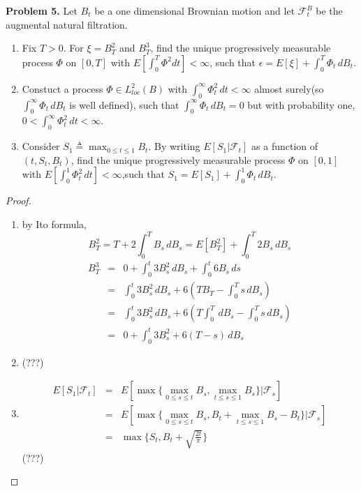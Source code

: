 \documentclass{article}     %
\begin{document}
\noindent 
\textbf{Problem 5.} Let $B_t$ be a one dimensional Brownian motion and let ${\mathcal{F}_t^B}$ be the augmental natural filtration.
\begin{enumerate}[(1)]
    \item Fix $T>0$. For $\xi = B_T^2$ and $B_T^3$, find the unique progressively measurable process $\Phi$ on $[0,T]$ with $E[\int_0^T\Phi^2 dt]<\infty$, such that $\epsilon = E[\xi]+\int_0^T\Phi_t\,d B_t$.
    \item Constuct a process $\Phi\in L^2_{loc}(B)$ with $\int_0^{\infty} \Phi_t^2\,dt <\infty$ almost surely(so $\int_0^{\infty}\Phi_t\,dB_t$ is well defined), such that $\int_0^{\infty} \Phi_t \,dB_t=0$ but with probability one, $0< \int_0^{\infty}\Phi_t^2\,dt<\infty$.
    \item Consider $S_1\triangleq \max_{0\leq t\leq 1}B_t$. By writing $E[S_1|\mathcal{F}_t]$ as a function of $(t,S_t,B_t)$, find the unique progressively measurable process $\Phi$ on $[0,1]$ with $E[\int_0^1 \Phi^2_t\,dt]<\infty$,such that $S_1 = E[S_1] + \int_0^1 \Phi_t\,d B_t$.  
\end{enumerate}

\begin{proof}
\begin{enumerate}[(1)]
    \item  by Ito formula, \[B_T^2 = T + 2 \int_0^T B_s\,d B_s = E[B_T^2] + \int_0^T 2B_s\, dB_s\]
     \begin{eqnarray*}
         B_T^3  & = &  0 + \int_0^t 3B_s^2\,dB_s+ \int_0^t 6B_s\,ds\\
          &=& \int_0^t 3B_s^2\,dB_s+ 6(TB_T-\int_0^T s \,dB_s)\\
          & = & \int_0^t 3B_s^2\,dB_s+ 6(T\int_0^T \,dB_s-\int_0^Ts\,dB_s)\\
          & = & 0 + \int_0^t 3B_s^2 + 6(T-s)\,dB_s
    \end{eqnarray*}
    \item (???)
    \item \begin{eqnarray*}
        E[S_1|\mathcal{F}_t] & =  & E[\max\{\max_{0\leq s\leq t}B_s, \max_{t\leq s\leq 1}B_s\}|\mathcal{F}_s]\\
                 & = & E[\max\{\max_{0\leq s\leq t}B_s,B_t+ \max_{t\leq s\leq 1}B_s-B_t\}|\mathcal{F}_s]\\
                 & = & \max\{S_t, B_t + \sqrt{\frac{2t}{\pi}}\}
         \end{eqnarray*}
        (???)
\end{enumerate}
\end{proof}
\end{document}
